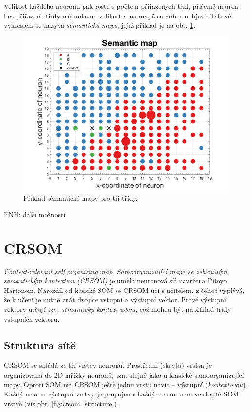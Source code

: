 \documentclass[thesis=M,czech]{FITthesis}[2012/06/26]
\begin{document}
Velikost každého neuronu pak roste s počtem přiřazených tříd, přičemž neuron bez přiřazené třídy má nulovou velikost a na mapě se vůbec nebjeví. Takové vykreslení se nazývá \textit{sémantická mapa}, jejíž příklad je na obr. \ref{fig:semanticmap}.


\begin{figure}[htbp]
\begin{center}
	\includegraphics[scale=0.3]{exp_sem_map.png}
\caption{Příklad sémantické mapy pro tři třídy.}
\label{fig:semanticmap}
\end{center}
\end{figure}


ENH: další možnosti



\section{CRSOM}\label{sec:crsom_teo}
\textit{Context-relevant self organizing map, Samoorganizující mapa se zahrnutým sémantickým kontextem (CRSOM)} je umělá neuronová síť navržena Pitoyo Hartonem. Narozdíl od kasické SOM se CRSOM učí s učitelem, z čehož vyplývá, že k učení je nutné znát dvojice vstupní a výstupní vektor. Právě výstupní vektory určují tzv. \textit{sémantický kontext učení}, což mohou být například třídy vstupních vektorů.

\subsection{Struktura sítě}
CRSOM se skládá ze tří vrstev neuronů. Prostřední (skrytá) vrstva je organizovaná do 2D mřížky neuronů, tzn. stejně jako u klasické samoorganizující mapy.
 Oproti SOM má CRSOM ještě jednu vrstu navíc -- výstupní (\textit{kontextovou}).  Každý neuron výstupní vrstvy je propojen s každým neuronem ve skryté SOM vrstvě (viz obr. \ref{fig:crsom_structure}). 
 
\end{document}
